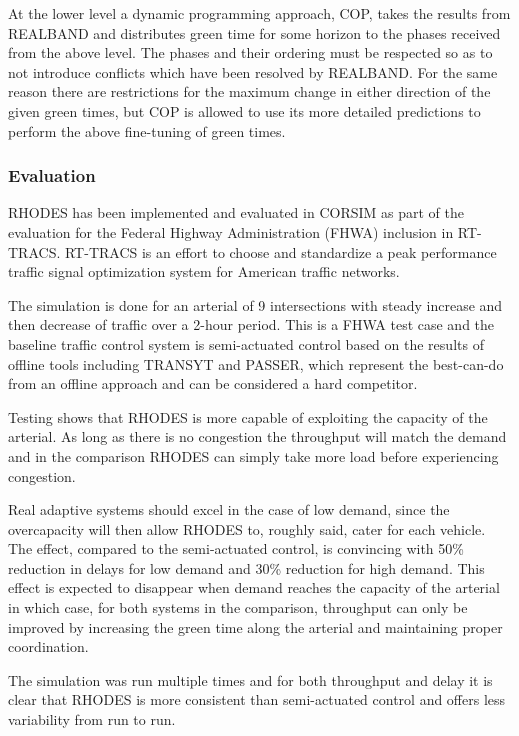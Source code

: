 At the lower level a dynamic programming approach, COP, takes the
results from REALBAND and distributes green time for some horizon to
the phases received from the above level. The phases and their
ordering must be respected so as to not introduce conflicts which
have been resolved by REALBAND. For the same reason there are
restrictions for the maximum change in either direction of the given
green times, but COP is allowed to use its more detailed predictions
to perform the above fine-tuning of green times.

\subsubsection*{Evaluation}
RHODES has been implemented and evaluated in CORSIM as part of the
evaluation for the Federal Highway Administration (FHWA) inclusion in
RT-TRACS. RT-TRACS is an effort to choose and standardize a peak
performance traffic signal optimization system for American traffic
networks.

The simulation is done for an arterial of 9 intersections with steady
increase and then decrease of traffic over a 2-hour period. This is a
FHWA test case and the baseline traffic control system is
semi-actuated control based on the results of offline tools including
TRANSYT and PASSER, which represent the best-can-do from an offline
approach and can be considered a hard competitor.

Testing shows that RHODES is more capable of exploiting the capacity
of the arterial. As long as there is no congestion the throughput will
match the demand and in the comparison RHODES can simply take more
load before experiencing congestion.

Real adaptive systems should excel in the case of low demand, since
the overcapacity will then allow RHODES to, roughly said, cater for
each vehicle. The effect, compared to the semi-actuated control, is
convincing with 50\% reduction in delays for low demand and 30\%
reduction for high demand. This effect is expected to disappear when
demand reaches the capacity of the arterial in which case, for both
systems in the comparison, throughput can only be improved by
increasing the green time along the arterial and maintaining proper
coordination.

The simulation was run multiple times and for both throughput and
delay it is clear that RHODES is more consistent than semi-actuated
control and offers less variability from run to run.
